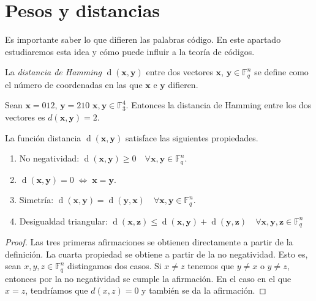 \section{Pesos y distancias}

Es importante saber lo que difieren las palabras código. En este apartado estudiaremos esta idea y cómo puede influir a la teoría de códigos.

\begin{definition}
    La \emph{distancia de Hamming} $\operatorname{d}(\mathbf{x},\mathbf{y})$ entre dos vectores $\mathbf{x}$, $\mathbf{y} \in \mathbb{F}_q^n$ se define como el número de coordenadas en las que $\mathbf{x}$ e $\mathbf{y}$ difieren.
\end{definition}

\begin{exampleth}
    Sean $\mathbf{x} = 012$, $\mathbf{y} = 210$ $\mathbf{x}, \mathbf{y} \in \mathbb{F}_3^4$. Entonces la distancia de Hamming entre los dos vectores es $d(\mathbf{x}, \mathbf{y}) = 2$.
\end{exampleth}

\begin{theorem}
    La función distancia $\operatorname{d}(\mathbf{x},\mathbf{y})$ satisface las siguientes propiedades.

    \begin{enumerate}
        \item No negatividad: $\operatorname{d}(\mathbf{x},\mathbf{y}) \geq 0 \quad \forall \mathbf{x},\mathbf{y} \in \mathbb{F}_q^n$.
        \item $\operatorname{d}(\mathbf{x},\mathbf{y}) = 0 \; \Leftrightarrow \; \mathbf{x} = \mathbf{y}$.
        \item Simetría: $\operatorname{d}(\mathbf{x},\mathbf{y}) = \operatorname{d}(\mathbf{y},\mathbf{x}) \quad \forall \mathbf{x},\mathbf{y} \in \mathbb{F}_q^n$.
        \item Desigualdad triangular: $\operatorname{d}(\mathbf{x},\mathbf{z}) \leq \operatorname{d}(\mathbf{x},\mathbf{y}) + \operatorname{d}(\mathbf{y},\mathbf{z}) \quad \forall \mathbf{x},\mathbf{y},\mathbf{z} \in \mathbb{F}_q^n$
    \end{enumerate}
\end{theorem}

\begin{proof}
    Las tres primeras afirmaciones se obtienen directamente a partir de la definición.
    La cuarta propiedad se obtiene a partir de la no negatividad. Esto es, sean $x,y,z \in \mathbb{F}_q^n$ distingamos dos casos. Si $x \neq z$
    tenemos que $y \neq x$ o $y \neq z$, entonces por la no negatividad se cumple la afirmación.
    En el caso en el que $x = z$, tendríamos que $d(x,z) = 0$ y también se da la 
    afirmación.
\end{proof}

